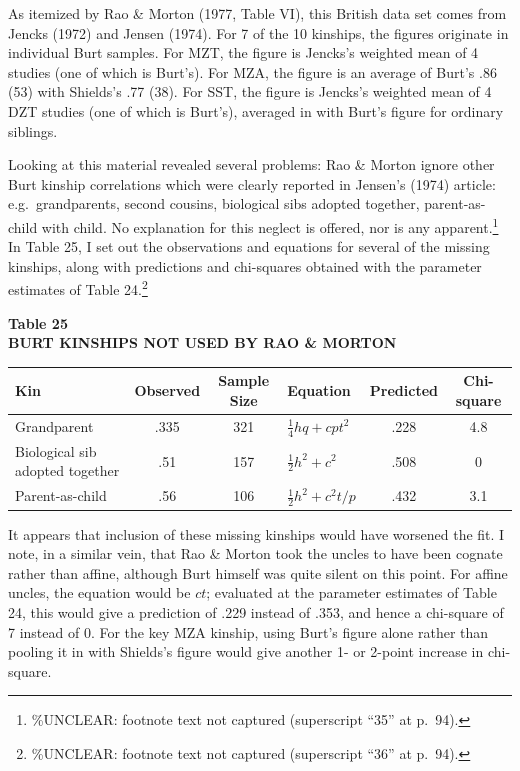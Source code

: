 ﻿\documentclass[12pt]{article}
\begin{document}
As itemized by Rao \& Morton (1977, Table VI), this British data set comes from Jencks (1972) and Jensen (1974). For 7 of the 10 kinships, the figures originate in individual Burt samples. For MZT, the figure is Jencks's weighted mean of 4 studies (one of which is Burt's). For MZA, the figure is an average of Burt's .86 (53) with Shields's .77 (38). For SST, the figure is Jencks's weighted mean of 4 DZT studies (one of which is Burt's), averaged in with Burt's figure for ordinary siblings.

Looking at this material revealed several problems: Rao \& Morton ignore other Burt kinship correlations which were clearly reported in Jensen's (1974) article: e.g.\ grandparents, second cousins, biological sibs adopted together, parent-as-child with child. No explanation for this neglect is offered, nor is any apparent.\footnote{\%UNCLEAR: footnote text not captured (superscript ``35'' at p.\ 94).} In Table 25, I set out the observations and equations for several of the missing kinships, along with predictions and chi-squares obtained with the parameter estimates of Table 24.\footnote{\%UNCLEAR: footnote text not captured (superscript ``36'' at p.\ 94).}

\begin{center}
\textbf{Table 25}\\
\textbf{BURT KINSHIPS NOT USED BY RAO \& MORTON}
\end{center}
\begin{center}
\begin{tabular}{l c c l c c}
\hline
Kin & Observed & Sample Size & Equation & Predicted & Chi-square \\
\hline
Grandparent & .335 & 321 & $\tfrac14hq+cpt^2$ & .228 & 4.8 \\
Biological sib adopted together & .51 & 157 & $\tfrac12h^2+c^2$ & .508 & 0 \\
Parent-as-child & .56 & 106 & $\tfrac12h^2+c^2t/p$ & .432 & 3.1 \\
\hline
\end{tabular}
\end{center}

It appears that inclusion of these missing kinships would have worsened the fit. I note, in a similar vein, that Rao \& Morton took the uncles to have been cognate rather than affine, although Burt himself was quite silent on this point. For affine uncles, the equation would be $ct$; evaluated at the parameter estimates of Table 24, this would give a prediction of .229 instead of .353, and hence a chi-square of 7 instead of 0. For the key MZA kinship, using Burt's figure alone rather than pooling it in with Shields's figure would give another 1- or 2-point increase in chi-square.
\end{document}
